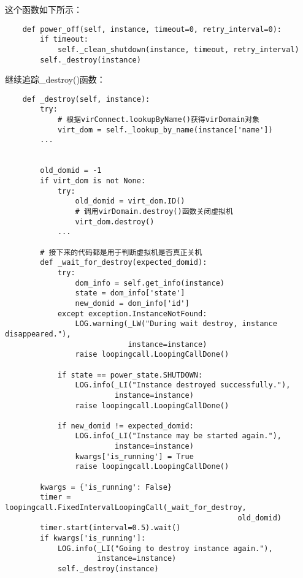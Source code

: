 \documentclass[a4paper,left=1.5cm,right=1.5cm,11pt]{article}
\begin{document}
	这个函数如下所示：
	\begin{lstlisting}
	def power_off(self, instance, timeout=0, retry_interval=0):
        if timeout:
            self._clean_shutdown(instance, timeout, retry_interval)
        self._destroy(instance)
	\end{lstlisting}

	继续追踪\_destroy()函数：
	\begin{lstlisting}
	def _destroy(self, instance):
        try:
			# 根据virConnect.lookupByName()获得virDomain对象
            virt_dom = self._lookup_by_name(instance['name'])
        ...

        
        old_domid = -1
        if virt_dom is not None:
            try:
                old_domid = virt_dom.ID()
				# 调用virDomain.destroy()函数关闭虚拟机
                virt_dom.destroy()
            ...
		
		# 接下来的代码都是用于判断虚拟机是否真正关机
        def _wait_for_destroy(expected_domid):
            try:
                dom_info = self.get_info(instance)
                state = dom_info['state']
                new_domid = dom_info['id']
            except exception.InstanceNotFound:
                LOG.warning(_LW("During wait destroy, instance disappeared."),
                            instance=instance)
                raise loopingcall.LoopingCallDone()

            if state == power_state.SHUTDOWN:
                LOG.info(_LI("Instance destroyed successfully."),
                         instance=instance)
                raise loopingcall.LoopingCallDone()

            if new_domid != expected_domid:
                LOG.info(_LI("Instance may be started again."),
                         instance=instance)
                kwargs['is_running'] = True
                raise loopingcall.LoopingCallDone()

        kwargs = {'is_running': False}
        timer = loopingcall.FixedIntervalLoopingCall(_wait_for_destroy,
                                                     old_domid)
        timer.start(interval=0.5).wait()
        if kwargs['is_running']:
            LOG.info(_LI("Going to destroy instance again."),
                     instance=instance)
            self._destroy(instance)
	\end{lstlisting}

\clearpage
\end{document}

